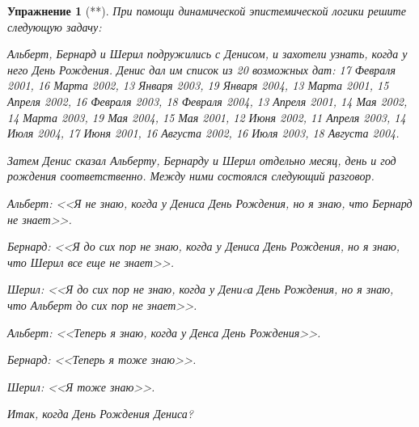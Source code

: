 \documentclass[11pt]{article}
\newtheorem{exercise}[theorem]{Упражнение}
\begin{document}
\begin{exercise}[**] При помощи динамической эпистемической логики решите следующую задачу:

Альберт, Бернард и Шерил подружились с Денисом, и захотели узнать, когда у него День Рождения. Денис дал им список из 20 возможных дат:  17 Февраля 2001, 16 Марта 2002, 13 Января 2003, 19 Января 2004, 13 Марта 2001, 15 Апреля 2002, 16 Февраля 2003, 18 Февраля 2004, 13 Апреля 2001, 14 Мая 2002, 14 Марта 2003, 19 Мая 2004, 15 Мая 2001, 12 Июня 2002, 11 Апреля 2003, 14 Июля 2004, 17 Июня 2001, 16 Августа 2002, 16 Июля 2003, 18 Августа 2004. 

Затем Денис сказал Альберту, Бернарду и Шерил отдельно месяц, день и год рождения соответственно. Между ними состоялся следующий разговор. 

Альберт: <<Я не знаю, когда у Дениса День Рождения, но я знаю, что Бернард не знает>>. 

Бернард: <<Я до сих пор не знаю, когда у Дениса  День Рождения, но я знаю, что Шерил все еще не знает>>. 

Шерил: <<Я до сих пор не знаю, когда у Дениcа День Рождения, но я знаю, что Альберт до сих пор не знает>>. 

Альберт: <<Теперь я знаю, когда у Денса День Рождения>>.

Бернард: <<Теперь я тоже знаю>>.

Шерил: <<Я тоже знаю>>.

\begin{center}
Итак, когда День Рождения Дениса?	
\end{center}

\end{exercise}
\end{document}
